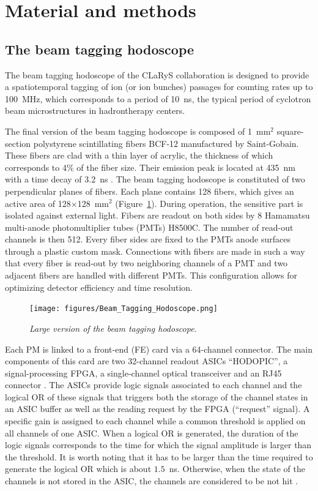\documentclass[a4paper,11pt]{article}
\begin{document}
\section{Material and methods}
\subsection{The beam tagging hodoscope}
\label{sec:hodo}

The beam tagging hodoscope of the CLaRyS collaboration is designed to provide a spatiotemporal tagging of ion (or ion bunches) passages for counting rates up to 100~MHz, which corresponds to a period of 10~ns, the typical period of cyclotron beam microstructures in hadrontherapy centers. 

The final version of the beam tagging hodoscope is composed  of 1~mm$^{2}$ square-section polystyrene scintillating fibers BCF-12 manufactured by Saint-Gobain. These fibers are clad with a thin layer of acrylic, the thickness of which corresponds to 4\% of the fiber size. Their emission peak is located at 435~nm with a time decay of 3.2~ns \cite{SaintGobain2017}.
The beam tagging hodoscope is constituted of two perpendicular planes of fibers. Each plane contains 128 fibers, which gives an active area of 128$\times$128~mm$^{2}$ (Figure~\ref{fig:hodoscope}). During operation, the sensitive part is isolated against external light. Fibers are readout on both sides by 8 Hamamatsu multi-anode photomultiplier tubes (PMTs) H8500C. The number of read-out channels is then 512. Every fiber sides are fixed to the PMTs anode surfaces through a plastic custom mask. Connections with fibers are made in such a way that every fiber is read-out by two neighboring channels of a PMT and two adjacent fibers are handled with different PMTs. This configuration allows for optimizing detector efficiency and time resolution. 

\begin{figure}[htb]
\centering
\texttt{[image: figures/Beam\_Tagging\_Hodoscope.png]}
\caption{\small{\textit{Large version of the beam tagging hodoscope.}}}
\label{fig:hodoscope}
\end{figure}

Each PM is linked to a front-end (FE) card via a 64-channel connector. The main components of this card are two 32-channel readout ASICs \enquote{HODOPIC}, a signal-processing FPGA, a single-channel optical transceiver and an RJ45 connector \cite{Chen2019}. The ASICs provide logic signals associated to each channel and the logical OR of these signals that triggers both the storage of the channel states in an ASIC buffer as well as the reading request by the FPGA (\enquote{request} signal). A specific gain is assigned to each channel while a common threshold is applied on all channels of one ASIC. When a logical OR is generated, the duration of the logic signals corresponds to the time for which the signal amplitude is larger than the threshold. It is worth noting that it has to be larger than the time required to generate the logical OR which is about $1.5$~ns. Otherwise, when the state of the channels is not stored in the ASIC, the channels are considered to be not hit .
\end{document}

